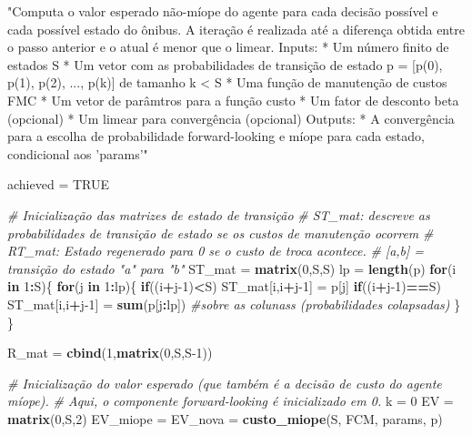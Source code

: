 \documentclass[12pt,a4paper]{article}
\newenvironment{Shaded}{\begin{snugshade}}{\end{snugshade}}
\newcommand{\CommentTok}[1]{\textcolor[rgb]{0.56,0.35,0.01}{\textit{#1}}}
\newcommand{\ControlFlowTok}[1]{\textcolor[rgb]{0.13,0.29,0.53}{\textbf{#1}}}
\newcommand{\DecValTok}[1]{\textcolor[rgb]{0.00,0.00,0.81}{#1}}
\newcommand{\KeywordTok}[1]{\textcolor[rgb]{0.13,0.29,0.53}{\textbf{#1}}}
\newcommand{\NormalTok}[1]{#1}
\newcommand{\OperatorTok}[1]{\textcolor[rgb]{0.81,0.36,0.00}{\textbf{#1}}}
\newcommand{\OtherTok}[1]{\textcolor[rgb]{0.56,0.35,0.01}{#1}}
\newcommand{\StringTok}[1]{\textcolor[rgb]{0.31,0.60,0.02}{#1}}
\begin{document}
\begin{Shaded}
\begin{Highlighting}[]
{{{{{  \StringTok{"Computa o valor esperado não-míope do agente para cada decisão possível }
\StringTok{  e cada possível estado do ônibus.}
\StringTok{  A iteração é realizada até a diferença obtida entre o passo anterior e o atual}
\StringTok{  é menor que o limear.}
\StringTok{  Inputs:}
\StringTok{  * Um número finito de estados S}
\StringTok{  * Um vetor com as probabilidades de transição de estado p = [p(0), p(1), p(2), ..., p(k)] de tamanho k < S}
\StringTok{  * Uma função de manutenção de custos FMC}
\StringTok{  * Um vetor de parâmtros para a função custo}
\StringTok{  * Um fator de desconto beta (opcional)}
\StringTok{  * Um limear para convergência (opcional)}
\StringTok{  Outputs:}
\StringTok{  * A convergência para a escolha de probabilidade forward-looking e }
\StringTok{  míope para cada estado, condicional aos 'params'"}
  
\NormalTok{  achieved =}\StringTok{ }\OtherTok{TRUE}
  
  \CommentTok{# Inicialização das matrizes de estado de transição}
  \CommentTok{# ST_mat: descreve as probabilidades de transição de estado se os custos de manutenção ocorrem}
  \CommentTok{# RT_mat: Estado regenerado para 0 se o custo de troca acontece.}
  \CommentTok{# [a,b] = transição do estado "a" para "b"}
\NormalTok{  ST_mat =}\StringTok{ }\KeywordTok{matrix}\NormalTok{(}\DecValTok{0}\NormalTok{,S,S)}
\NormalTok{  lp =}\StringTok{ }\KeywordTok{length}\NormalTok{(p)}
  \ControlFlowTok{for}\NormalTok{(i }\ControlFlowTok{in} \DecValTok{1}\OperatorTok{:}\NormalTok{S)\{}
    \ControlFlowTok{for}\NormalTok{(j }\ControlFlowTok{in} \DecValTok{1}\OperatorTok{:}\NormalTok{lp)\{}
      \ControlFlowTok{if}\NormalTok{((i}\OperatorTok{+}\NormalTok{j}\DecValTok{-1}\NormalTok{)}\OperatorTok{<}\NormalTok{S)  ST_mat[i,i}\OperatorTok{+}\NormalTok{j}\DecValTok{-1}\NormalTok{] =}\StringTok{ }\NormalTok{p[j]}
      \ControlFlowTok{if}\NormalTok{((i}\OperatorTok{+}\NormalTok{j}\DecValTok{-1}\NormalTok{)}\OperatorTok{==}\NormalTok{S) ST_mat[i,i}\OperatorTok{+}\NormalTok{j}\DecValTok{-1}\NormalTok{] =}\StringTok{ }\KeywordTok{sum}\NormalTok{(p[j}\OperatorTok{:}\NormalTok{lp]) }\CommentTok{#sobre as colunass (probabilidades colapsadas)}
\NormalTok{    \}}
\NormalTok{  \}}
  
\NormalTok{  R_mat =}\StringTok{ }\KeywordTok{cbind}\NormalTok{(}\DecValTok{1}\NormalTok{,}\KeywordTok{matrix}\NormalTok{(}\DecValTok{0}\NormalTok{,S,S}\DecValTok{-1}\NormalTok{))}
  
  \CommentTok{# Inicialização do valor esperado (que também é a decisão de custo do agente míope).}
  \CommentTok{# Aqui, o componente forward-looking é inicializado em 0.}
\NormalTok{  k =}\StringTok{ }\DecValTok{0}
\NormalTok{  EV =}\StringTok{ }\KeywordTok{matrix}\NormalTok{(}\DecValTok{0}\NormalTok{,S,}\DecValTok{2}\NormalTok{)}
\NormalTok{  EV_miope =}\StringTok{ }\NormalTok{EV_nova =}\StringTok{ }\KeywordTok{custo_miope}\NormalTok{(S, FCM, params, p)}
  
}}}}}
\end{Highlighting}
\end{Shaded}
\end{document}
